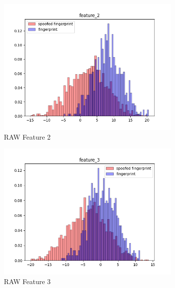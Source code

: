 \documentclass[english]{report}
\begin{document}
\begin{figure}[h!]
\begin{subfigure}{0.3\textwidth}
        \includegraphics[scale=0.3]{../../images/feature_plot/hist_feature_2}
        \caption{RAW Feature 2}
    \end{subfigure}
    \begin{subfigure}{0.3\textwidth}
        \includegraphics[scale=0.3]{../../images/feature_plot/hist_feature_3}
        \caption{RAW Feature 3}
    \end{subfigure}
    \begin{subfigure}{0.3\textwidth}

\end{subfigure}
\end{figure}
\end{document}
